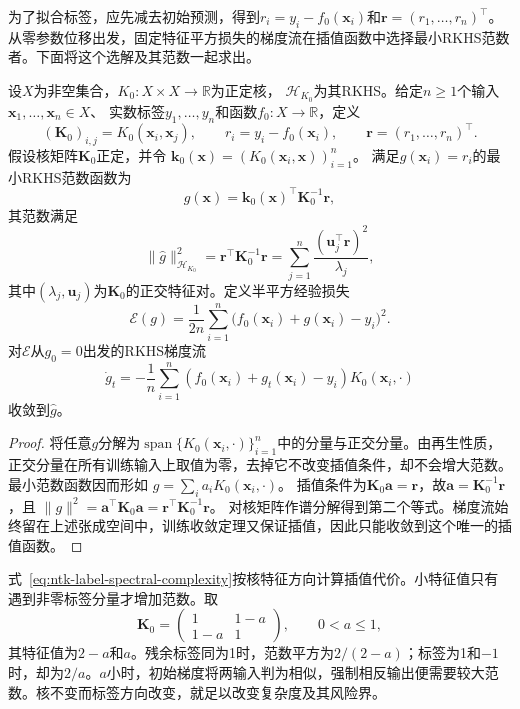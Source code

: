 为了拟合标签，应先减去初始预测，得到$r_i=y_i-f_0(\bm x_i)$和$\bm r=(r_1,\ldots,r_n)^\top$。从零参数位移出发，固定特征平方损失的梯度流在插值函数中选择最小RKHS范数者。下面将这个选解及其范数一起求出。

\begin{theorem}[初始梯度特征的最小范数插值]
\label{thm:ntk-minimum-rkhs-norm}
设$X$为非空集合，$K_0:X\times X\to\mathbb R$为正定核，
$\mathcal H_{K_0}$为其RKHS。给定$n\geq1$个输入$\bm x_1,\ldots,\bm x_n\in X$、
实数标签$y_1,\ldots,y_n$和函数$f_0:X\to\mathbb R$，定义
\[
 (\bm K_0)_{i,j}=K_0(\bm x_i,\bm x_j),\qquad
 r_i=y_i-f_0(\bm x_i),\qquad
 \bm r=(r_1,\ldots,r_n)^\top.
\]
假设核矩阵$\bm K_0$正定，并令
$\bm k_0(\bm x)=(K_0(\bm x_i,\bm x))_{i=1}^{n}$。
满足$g(\bm x_i)=r_i$的最小RKHS范数函数为
\[
 \widehat g(\bm x)=\bm k_0(\bm x)^\top\bm K_0^{-1}\bm r,
\]
其范数满足
\begin{equation}
 \|\widehat g\|_{\mathcal H_{K_0}}^2
 =\bm r^\top\bm K_0^{-1}\bm r
 =\sum_{j=1}^n\frac{(\bm u_j^\top\bm r)^2}{\lambda_j},
 \label{eq:ntk-label-spectral-complexity}
\end{equation}
其中$(\lambda_j,\bm u_j)$为$\bm K_0$的正交特征对。定义半平方经验损失
\[
 \mathcal E(g)=\frac1{2n}\sum_{i=1}^n
 \bigl(f_0(\bm x_i)+g(\bm x_i)-y_i\bigr)^2.
\]
对$\mathcal E$从$g_0=0$出发的RKHS梯度流
\[
 \dot g_t=-\frac1n\sum_{i=1}^n
 (f_0(\bm x_i)+g_t(\bm x_i)-y_i)K_0(\bm x_i,\cdot)
\]
收敛到$\widehat g$。
\end{theorem}
\begin{proof}
将任意$g$分解为$\operatorname{span}\{K_0(\bm x_i,\cdot)\}_{i=1}^n$中的分量与正交分量。由再生性质，正交分量在所有训练输入上取值为零，去掉它不改变插值条件，却不会增大范数。最小范数函数因而形如
$g=\sum_i a_iK_0(\bm x_i,\cdot)$。
插值条件为$\bm K_0\bm a=\bm r$，故$\bm a=\bm K_0^{-1}\bm r$，且
$\|g\|^2=\bm a^\top\bm K_0\bm a=\bm r^\top\bm K_0^{-1}\bm r$。
对核矩阵作谱分解得到第二个等式。梯度流始终留在上述张成空间中，训练收敛定理又保证插值，因此只能收敛到这个唯一的插值函数。
\end{proof}

式~\eqref{eq:ntk-label-spectral-complexity}按核特征方向计算插值代价。小特征值只有遇到非零标签分量才增加范数。取
\[
 \bm K_0=\begin{pmatrix}1&1-a\\1-a&1\end{pmatrix},\qquad 0<a\leq1,
\]
其特征值为$2-a$和$a$。残余标签同为1时，范数平方为$2/(2-a)$；标签为1和$-1$时，却为$2/a$。$a$小时，初始梯度将两输入判为相似，强制相反输出便需要较大范数。核不变而标签方向改变，就足以改变复杂度及其风险界。

